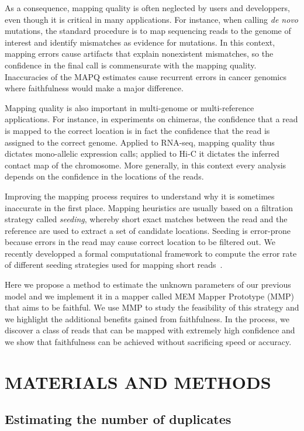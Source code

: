 \documentclass[a4,center,fleqn]{NAR}
\begin{document}
As a consequence, mapping quality is often neglected by users and
developpers, even though it is critical in many applications. For
instance, when calling \textit{de novo} mutations, the standard procedure
is to map sequencing reads to the genome of interest and identify mismatches
as evidence for mutations. In this context, mapping errors cause artifacts that
explain nonexistent mismatches,
so the confidence in the final call is commensurate with the mapping
quality. Inaccuracies of the MAPQ estimates cause recurrent errors in
cancer genomics~\cite{dunno} where faithfulness would make a major
difference.

Mapping quality is also important in multi-genome or multi-reference
applications. For instance, in experiments on chimeras, the confidence
that a read is mapped to the correct location is in fact the confidence
that the read is assigned to the correct genome. Applied to RNA-seq,
mapping quality thus dictates mono-allelic expression calls; applied to
Hi-C it dictates the inferred contact map of the chromosome. More
generally, in this context every analysis depends on the confidence in
the locations of the reads.

Improving the mapping process requires to understand why it is sometimes
inaccurate in the first place. Mapping heuristics are usually based on a
filtration strategy called \emph{seeding}, whereby short exact matches between
the read and the reference are used to extract a set of candidate
locations. Seeding is error-prone because errors in the read may cause correct
location to be filtered out. We recently developped a formal computational
framework to compute the error rate of different seeding strategies used
for mapping short reads~\cite{Filion619155}.

Here we propose a method to estimate the unknown parameters of our previous
model and we implement it in a mapper called MEM Mapper Prototype (MMP) that
aims to be faithful. We use MMP to study the feasibility of this
strategy and we highlight the additional benefits gained from faithfulness.
In the process, we discover a class of reads that can be mapped with extremely
high confidence and we show that faithfulness can be achieved without sacrificing
speed or accuracy.


\section{MATERIALS AND METHODS}

\subsection{Estimating the number of duplicates}
\end{document}
